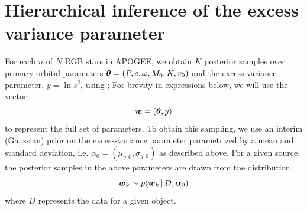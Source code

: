 \documentclass[modern, letterpaper]{aastex62}
\newcommand{\apogee}{\project{\acronym{APOGEE}}}
\newcommand{\sdssiv}{\project{\acronym{SDSS-IV}}}
\newcommand{\thejoker}{\project{The~Joker}}
\begin{document}

\facility{\sdssiv, \apogee}




\clearpage

\appendix
\section{Hierarchical inference of the excess variance parameter}
\label{sec:hierarch}

For each $n$ of $N$ RGB stars in APOGEE, we obtain $K$ posterior samples over
primary orbital parameters $\boldsymbol{\theta} = (P, e, \omega, M_0, K, v_0)$ and the
excess-variance parameter, $y = \ln s^2$, using \thejoker; For brevity in
expressions below, we will use the vector
\begin{equation}
    \bs{w} = (\bs{\theta}, y)
\end{equation}
to represent the full set of parameters.
To obtain this sampling, we use an interim (Gaussian) prior on the
excess-variance parameter parametrized by a mean and standard deviation, i.e.
$\alpha_0 = (\mu_{y,0}, \sigma_{y,0})$ as described above.
For a given source, the posterior samples in the above parameters are drawn from
the distribution
\begin{equation}
    \bs{w}_k \sim p(\bs{w}_k \given D, \bs{\alpha}_0)
\end{equation}
where $D$ represents the data for a given object.
\end{document}
